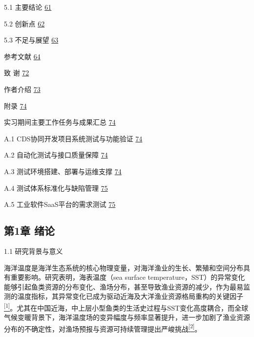 \documentclass[
  12pt,
]{article}
\begin{document}
5.1 主要结论 \hyperref[_Toc1202164245]{61}

5.2 创新点 \hyperref[_Toc1248314739]{62}

5.3 不足与展望
\hyperref[ux5b9eux4e60ux671fux95f4ux4e3bux8981ux5de5ux4f5cux4efbux52a1ux4e0eux6210ux679cux6c47ux603b]{63}

参考文献 \hyperref[ux53c2ux8003ux6587ux732e]{64}

致 谢 \hyperref[ux81f4-ux8c22]{72}

作者介绍 \hyperref[ux4f5cux8005ux4ecbux7ecd]{73}

附录 \hyperref[ux9644ux5f55]{74}

实习期间主要工作任务与成果汇总
\hyperref[ux5b9eux4e60ux671fux95f4ux4e3bux8981ux5de5ux4f5cux4efbux52a1ux4e0eux6210ux679cux6c47ux603b]{74}

A.1 CDS协同开发项目系统测试与功能验证
\hyperref[a.1-cdsux534fux540cux5f00ux53d1ux9879ux76eeux7cfbux7edfux6d4bux8bd5ux4e0eux529fux80fdux9a8cux8bc1]{74}

A.2 自动化测试与接口质量保障
\hyperref[a.2-ux81eaux52a8ux5316ux6d4bux8bd5ux4e0eux63a5ux53e3ux8d28ux91cfux4fddux969c]{74}

A.3 测试环境搭建、部署与运维支撑
\hyperref[a.3-ux6d4bux8bd5ux73afux5883ux642dux5efaux90e8ux7f72ux4e0eux8fd0ux7ef4ux652fux6491]{74}

A.4 测试体系标准化与缺陷管理
\hyperref[a.4-ux6d4bux8bd5ux4f53ux7cfbux6807ux51c6ux5316ux4e0eux7f3aux9677ux7ba1ux7406]{75}

A.5 工业软件SaaS平台的需求测试
\hyperref[a.5-ux5de5ux4e1aux8f6fux4ef6saasux5e73ux53f0ux7684ux9700ux6c42ux6d4bux8bd5]{75}

\protect{}\label{_Toc1619232084}{}

\subsection{第1章 绪论}\label{ux7b2c1ux7ae0-ux7eeaux8bba}

\protect{}\label{_Toc1520861004}{}1.1 研究背景与意义

海洋温度是海洋生态系统的核心物理变量，对海洋渔业的生长、繁殖和空间分布具有重要影响。研究表明，海表温度（sea
surface
temperature，SST）的异常变化能够引起鱼类资源的分布变化、渔场分布，甚至导致渔业资源的减少，作为最易监测的温度指标，其异常变化已成为驱动近海及大洋渔业资源格局重构的关键因子\hyperref[_Ref165148613]{\textsuperscript{{[}1{]}}}。尤其在中国近海，中上层小型鱼类的生活史过程与SST变化高度耦合，而全球气候变暖背景下，海洋温度场的变异幅度与频率显著提升，进一步加剧了渔业资源分布的不确定性，对渔场预报与资源可持续管理提出严峻挑战\hyperref[_Ref165148613]{\textsuperscript{{[}2{]}}}。
\end{document}
